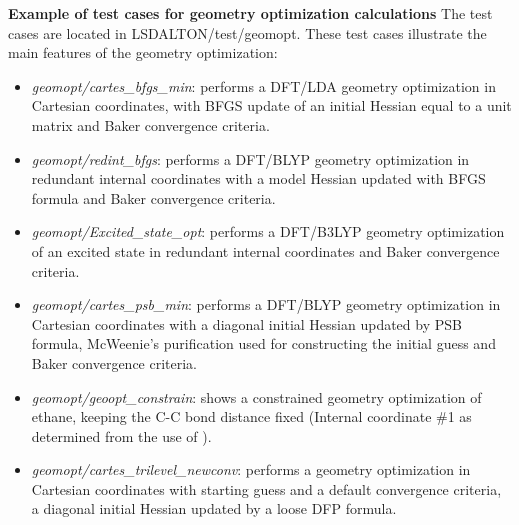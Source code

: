 \vspace{1 cm}
\noindent
\textbf{Example of test cases for geometry optimization calculations} \newline
The test cases are located in LSDALTON/test/geomopt.
These test cases illustrate the main features of the geometry optimization:
\begin{itemize}
\item
\textit{geomopt/cartes\_bfgs\_min}:
performs a DFT/LDA geometry optimization in Cartesian coordinates,
with BFGS update of an initial Hessian equal to a unit matrix
and Baker convergence criteria.
\item
\textit{geomopt/redint\_bfgs}:
performs a DFT/BLYP geometry optimization in redundant internal coordinates
with a model Hessian updated with BFGS formula
and Baker convergence criteria.
\item
\textit{geomopt/Excited\_state\_opt}:
performs a DFT/B3LYP geometry optimization of an excited state in redundant internal coordinates
and Baker convergence criteria.
\item
\textit{geomopt/cartes\_psb\_min}:
performs a DFT/BLYP geometry optimization in Cartesian coordinates
with a diagonal initial Hessian updated by PSB formula,
McWeenie's purification used for constructing the initial guess
and Baker convergence criteria.
\item
\textit{geomopt/geoopt\_constrain}:
shows a constrained geometry optimization of ethane,
keeping the C-C bond distance fixed
(Internal coordinate \#1 as determined from the use of ).
\item
\textit{geomopt/cartes\_trilevel\_newconv}:
performs a geometry optimization in Cartesian coordinates
with  starting guess and a default convergence criteria,
 a diagonal initial Hessian updated by a loose DFP formula.
\end{itemize}

